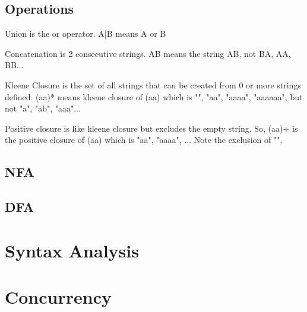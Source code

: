\documentclass[12pt,letterpaper]{article} \usepackage{amsmath} \usepackage{graphicx} \usepackage[margin=1in]{geometry} \usepackage{longtable}  \usepackage{amssymb}
\begin{document}
	\subsection{Operations}
	Union is the or operator. A|B means A or B
	
	Concatenation is 2 consecutive strings. AB means the string AB, not BA, AA, BB...
	
	Kleene Closure is the set of all strings that can be created from 0 or more strings defined. (aa)* means kleene closure of (aa) which is "", "aa", "aaaa", "aaaaaa", but not "a", "ab", "aaa"...
	
	Positive closure is like kleene closure but excludes the empty string. So, (aa)+ is the positive closure of (aa) which is "aa", "aaaa", ... Note the exclusion of "".
	
	\subsection{NFA}
	
	
	\subsection{DFA}
	
	\section{Syntax Analysis}
	
	\section{Concurrency}

	
\end{document}
